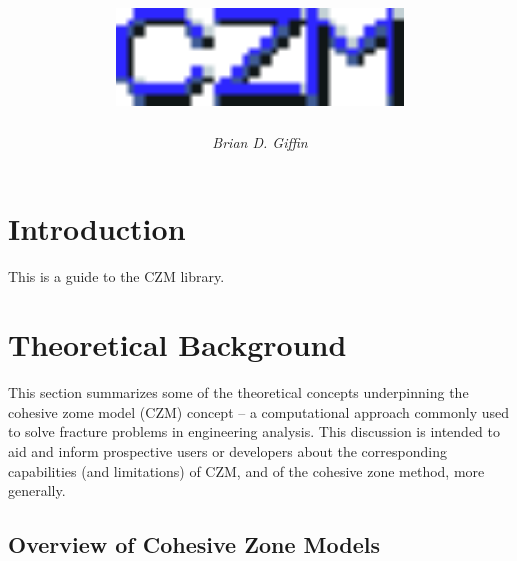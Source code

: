 \documentclass[12pt, a4paper,oneside, openany]{memoir}
\begin{document}
\title{ \includegraphics[width = 3in]{figures/czm_logo.pdf} }
\newcommand{\subtitle}{A cohesive zone modeling library}
\author{\textit{Brian D. Giffin}}
\date{} %

\maketitle

\thispagestyle{empty}

\frontmatter

\tableofcontents* %

\mainmatter

\chapter{Introduction}

This is a guide to the CZM library.

\newpage

\chapter{Theoretical Background} \label{sec:theory}

This section summarizes some of the theoretical concepts underpinning the cohesive zome model (CZM) concept -- a computational approach commonly used to solve fracture problems in engineering analysis. This discussion is intended to aid and inform prospective users or developers about the corresponding capabilities (and limitations) of CZM, and of the cohesive zone method, more generally.

\section{Overview of Cohesive Zone Models}





\end{document}
